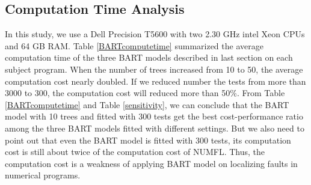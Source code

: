 \subsection{Computation Time Analysis}
In this study, we use a Dell Precision T5600 with two 2.30 GHz intel Xeon CPUs and 64 GB RAM. Table \ref{BARTcomputetime} summarized the average computation time of the three BART models described in last section on each subject program.  When the number of trees increased from 10 to 50, the average computation cost nearly doubled. If we reduced number the tests from more than 3000 to 300, the computation cost will reduced more than 50\%.  From Table \ref{BARTcomputetime} and Table \ref{sensitivity}, we can conclude that the BART model with 10 trees and fitted with 300 tests get the best cost-performance ratio among the three BART models fitted with different settings. But we also need to point out that even the BART model is fitted with 300 tests, its computation cost is still about twice of the computation cost of NUMFL. Thus, the computation cost is a weakness of applying BART model on localizing faults in numerical programs. 

